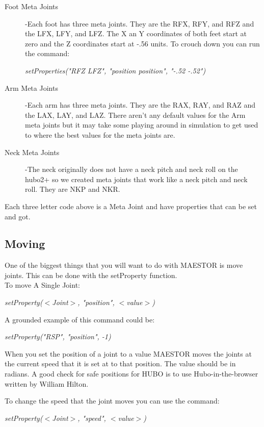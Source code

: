 \documentclass[12pt]{article}
\begin{document}
\begin{description}
	\item[Foot Meta Joints]
	-Each foot has three meta joints. They are the RFX, RFY, and RFZ and the LFX, LFY, and LFZ. The X an Y coordinates of both feet start at zero and the Z coordinates start at -.56 units. To crouch down you can run the command: 
	\begin{center}
		\textit{setProperties("RFZ LFZ", "position position", "-.52 -.52")}
	\end{center}
	
	
	\item[Arm Meta Joints]
	-Each arm has three meta joints. They are the RAX, RAY, and RAZ and the LAX, LAY, and LAZ. There aren't any default values for the Arm meta joints but it may take some playing around in simulation to get used to where the best values for the meta joints are. 
	
	\item[Neck Meta Joints]
	-The neck originally does not have a neck pitch and neck roll on the hubo2+ so we created meta joints that work like a neck pitch and neck roll. They are NKP and NKR. 
	
\end{description}
Each three letter code above is a Meta Joint and have properties that can be set and got.
\subsection{Moving}

One of the biggest things that you will want to do with MAESTOR is move joints. This can be done with the setProperty function.\\ 

To move A Single Joint:
	\begin{center}
		\textit{setProperty($<$Joint$>$, "position", $<$value$>$)}
	\end{center}
	
A grounded example of this command could be:
	\begin{center}
		\textit{setProperty("RSP", "position", -1)}
	\end{center}

When you set the position of a joint to a value MAESTOR moves the joints at the current speed that it is set at to that position. The value should be in radians. A good check for safe positions for HUBO is to use Hubo-in-the-browser written by William Hilton. 

To change the speed that the joint moves you can use the command:
	\begin{center}
		\textit{setProperty($<$Joint$>$, "speed", $<$value$>$)}
	\end{center}
	
\end{document}
